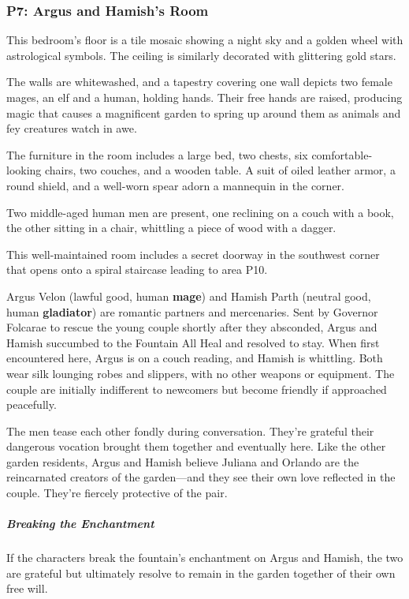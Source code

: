\documentclass[10pt,a4paper,twoside,bg=print,twocolumn,openany,nodeprecatedcode]{dndbook}
\begin{document}
\subsubsection{P7: Argus and Hamish's Room}
\begin{DndReadAloud}{}
This bedroom's floor is a tile mosaic showing a night sky and a golden wheel with astrological symbols. The ceiling is similarly decorated with glittering gold stars.

The walls are whitewashed, and a tapestry covering one wall depicts two female mages, an elf and a human, holding hands. Their free hands are raised, producing magic that causes a magnificent garden to spring up around them as animals and fey creatures watch in awe.

The furniture in the room includes a large bed, two chests, six comfortable-looking chairs, two couches, and a wooden table. A suit of oiled leather armor, a round shield, and a well-worn spear adorn a mannequin in the corner.

Two middle-aged human men are present, one reclining on a couch with a book, the other sitting in a chair, whittling a piece of wood with a dagger.

\end{DndReadAloud}

This well-maintained room includes a secret doorway in the southwest corner that opens onto a spiral staircase leading to area P10.

Argus Velon (lawful good, human \textbf{mage}) and Hamish Parth (neutral good, human \textbf{gladiator}) are romantic partners and mercenaries. Sent by Governor Folcarae to rescue the young couple shortly after they absconded, Argus and Hamish succumbed to the Fountain All Heal and resolved to stay. When first encountered here, Argus is on a couch reading, and Hamish is whittling. Both wear silk lounging robes and slippers, with no other weapons or equipment. The couple are initially indifferent to newcomers but become friendly if approached peacefully.

The men tease each other fondly during conversation. They're grateful their dangerous vocation brought them together and eventually here. Like the other garden residents, Argus and Hamish believe Juliana and Orlando are the reincarnated creators of the garden—and they see their own love reflected in the couple. They're fiercely protective of the pair.

\subparagraph{Breaking the Enchantment}
If the characters break the fountain's enchantment on Argus and Hamish, the two are grateful but ultimately resolve to remain in the garden together of their own free will.
\end{document}
